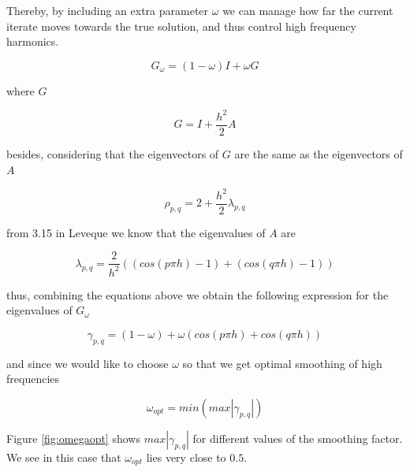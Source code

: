 \documentclass[main.tex]{subfiles}
\begin{document}
Thereby, by including an extra parameter $\omega$ we can manage how far the current iterate moves towards the true solution, and thus control high frequency harmonics.

\begin{equation}
G_\omega = (1-\omega)I + \omega G
\end{equation} 

where $G$

\begin{equation}
G = I + \frac{h^2}{2} A
\end{equation}

besides, considering that the eigenvectors of $G$ are the same as the eigenvectors of $A$

\begin{equation}
\rho_{p,q} = 2 + \frac{h^2}{2} \lambda_{p,q}
\end{equation}

from 3.15 in Leveque we know that the eigenvalues of $A$ are

\begin{equation}
\lambda_{p,q} = \frac{2}{h^2}((cos(p \pi h) -1) + (cos(q \pi h) -1 ))
\end{equation}

thus, combining the equations above we obtain the following expression for the eigenvalues of $G_\omega$

\begin{equation}
\gamma_{p,q} = (1-\omega) + \omega ( cos(p \pi h) + cos(q \pi h))
\end{equation}

and since we would like to choose $\omega$ so that we get optimal smoothing of high frequencies

\begin{equation}
\omega_{opt} = min ( max |\gamma_{p,q}|)
\end{equation}

Figure \ref{fig:omegaopt} shows $max |\gamma_{p,q}|$ for different values of the smoothing factor. We see in this case that $\omega_{opt}$ lies very close to $0.5$.
\end{document}
